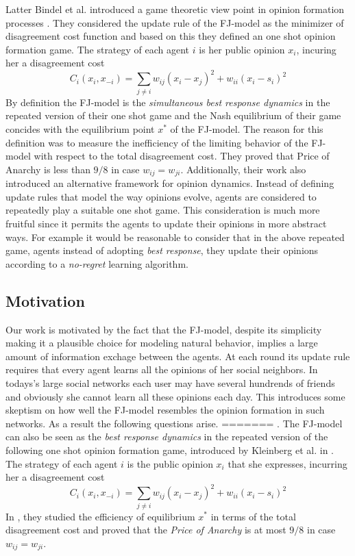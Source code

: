 Latter Bindel et al. introduced a game theoretic
view point in opinion formation processes \cite{BKO11}.
They considered the update rule of the FJ-model
as the minimizer of disagreement cost function
and based on this they defined an one shot 
opinion formation game. The strategy of each agent $i$ is 
her public opinion $x_i$, incuring her a 
disagreement cost \[C_i(x_i,x_{-i})=\sum_{j \neq i}w_{ij} 
(x_i-x_j)^2 + w_{ii}(x_i-s_i)^2\]
By definition the FJ-model is the 
\emph{simultaneous best response dynamics} in the repeated
version of their one shot game and the Nash equilibrium
of their game concides with the equilibrium point 
$x^*$ of the FJ-model. The reason for this definition
was to measure the inefficiency of the limiting behavior 
of the FJ-model with respect to the total disagreement cost.
They proved that Price of Anarchy is less than $9/8$
in case $w_{ij}=w_{ji}$. Additionally, their work also introduced
an alternative framework for opinion dynamics.
Instead of defining update rules that model the
way opinions evolve, agents are considered to repeatedly
play a suitable one shot game. This consideration is 
much more fruitful since it permits the agents to
update their opinions in more abstract ways.
For example it would be reasonable to consider
that in the above repeated game, agents instead of
adopting \emph{best response}, they update their opinions according 
to a \emph{no-regret} learning algorithm. 

\subsection{Motivation}
Our work is motivated by the fact that the FJ-model, 
despite its simplicity making it a plausible choice 
for modeling natural behavior, implies a large amount of
information exchage between the agents. At each round
its update rule requires that every agent learns all the 
opinions of her social neighbors.
In todays's large social networks each user
may have several hundrends of friends and obviously
she cannot learn all these opinions each day.
This introduces some skeptism on how well the 
FJ-model resembles the opinion formation in such
networks. As a result the following questions arise.
=======
\cite{GS14}. The FJ-model can also be seen as the \emph{best response
dynamics} in the repeated version of the following one shot
opinion formation game, introduced by Kleinberg et al. in \cite{BKO11}. 
The strategy of each agent $i$ is the public opinion $x_i$ that she expresses,
incurring her a disagreement cost \[C_i(x_i,x_{-i})=\sum_{j \neq i}w_{ij}(x_i-x_j)^2 + w_{ii}(x_i-s_i)^2\]
In \cite{BKO11}, they studied the efficiency of equilibrium $x^*$ in terms
of the total disagreement cost and proved that the 
\emph{Price of Anarchy} is at most $9/8$ in case $w_{ij}=w_{ji}$.

